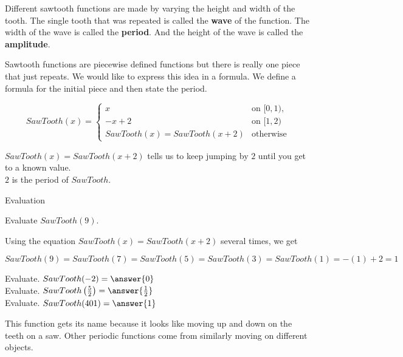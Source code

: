 \documentclass{ximera}
\begin{document}
Different sawtooth functions are made by varying the height and width of the tooth.  The single tooth that was repeated is called the \textbf{wave} of the function.  The width of the wave is called the \textbf{period}. And the height of the wave is called the \textbf{amplitude}.




Sawtooth functions are piecewise defined functions but there is really one piece that just repeats.  We would like to express this idea in a formula. We define a formula for the initial piece and then state the period.




\[
SawTooth(x) = 
\begin{cases}
  x &\text{on $[0,1)$,} \\
  -x+2 &\text{on $[1,2)$} \\ 
  SawTooth(x) = SawTooth(x+2) & \text{otherwise}
\end{cases}
\]


$SawTooth(x) = SawTooth(x+2)$ tells us to keep jumping by $2$ until you get to a known value. \\
$2$ is the period of $SawTooth$.


\begin{example} Evaluation


Evaluate  $SawTooth(9)$. 

Using the equation $SawTooth(x) = SawTooth(x+2)$ several times, we get 


\[
SawTooth(9) = SawTooth(7) = SawTooth(5) = SawTooth(3) = SawTooth(1) = -(1) + 2 = 1
\]


\begin{question}

Evaluate.  $SawTooth(-2) = \answer{0}$ \\

Evaluate.  $SawTooth\left( \frac{5}{2} \right) = \answer{\frac{1}{2}}$ \\

Evaluate.  $SawTooth(401) = \answer{1}$

\end{question}


\end{example}








This function gets its name because it looks like moving up and down on the teeth on a saw. Other periodic functions come from similarly moving on different objects. 
\end{document}
